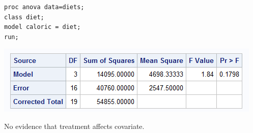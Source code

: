 \begin{small}
\begin{verbatim}
proc anova data=diets;
class diet;
model caloric = diet;
run;
\end{verbatim}
\end{small}

\begin{center}
\includegraphics{DietsCaloricANOVA}
\end{center}

No evidence that treatment affects covariate.\\~\\




